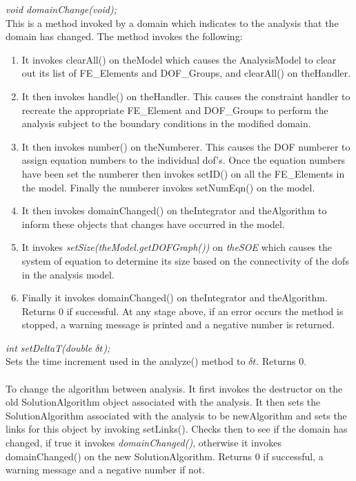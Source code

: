 {\em void domainChange(void);}\\
This is a method invoked by a domain which indicates to the analysis
that the domain has changed. The method invokes the following:
\begin{enumerate} 
\item It invokes clearAll() on \p theModel which causes the
AnalysisModel to clear out its list of FE\_Elements and DOF\_Groups,
and clearAll() on \p theHandler.
\item It then invokes handle() on \p theHandler. This causes
the constraint handler to recreate the appropriate FE\_Element and
DOF\_Groups to perform the analysis subject to the boundary conditions
in the modified domain.
\item It then invokes number() on \p theNumberer. This causes
the DOF numberer to assign equation numbers to the individual
dof's. Once the equation numbers have been set the numberer then
invokes setID() on all the FE\_Elements in the model. Finally
the numberer invokes setNumEqn() on the model.
\item It then invokes domainChanged() on \p theIntegrator and
\p theAlgorithm to inform these objects that changes have occurred
in the model.
\item It invokes {\em setSize(theModel.getDOFGraph())} on {\em
theSOE} which causes the system of equation to determine its size
based on the connectivity of the dofs in the analysis model. 
\item Finally it invokes domainChanged() on \p theIntegrator and 
\p theAlgorithm. 
Returns $0$ if successful. At any stage above, if an error occurs the
method is stopped, a warning message is printed and a negative number
is returned. \\ 
\end{enumerate}

{\em int setDeltaT(double $\delta t$);} \\
Sets the time increment used in the analyze() method to $\delta
t$. Returns $0$.\\

\\
To change the algorithm between analysis. It first invokes the
destructor on the old SolutionAlgorithm object associated with the
analysis. It then sets the SolutionAlgorithm 
associated with the analysis to be \p newAlgorithm and sets the
links for this object by invoking setLinks(). Checks then to
see if the domain has changed, if true it invokes {\em
domainChanged()}, otherwise it invokes domainChanged() on the
new SolutionAlgorithm. Returns $0$ if successful, a warning message
and a negative number if not.\\


